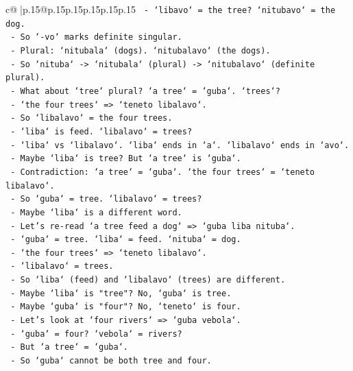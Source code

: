 \documentclass{article}
\begin{document}
{\begin{supertabular}{c@{$\;$}|p{.15\linewidth}@{}p{.15\linewidth}p{.15\linewidth}p{.15\linewidth}p{.15\linewidth}p{.15\linewidth}}
{{{\texttt{          {-} `libavo` = the tree? `nitubavo` = the dog.} \\
\texttt{          {-} So `{-}vo` marks definite singular.} \\
\texttt{          {-} Plural: `nitubala` (dogs). `nitubalavo` (the dogs).} \\
\texttt{          {-} So `nituba` {-}> `nitubala` (plural) {-}> `nitubalavo` (definite plural).} \\
\texttt{          {-} What about `tree` plural? `a tree` = `guba`. `trees`?} \\
\texttt{          {-} `the four trees` => `teneto libalavo`.} \\
\texttt{          {-} So `libalavo` = the four trees.} \\
\texttt{          {-} `liba` is feed. `libalavo` = trees?} \\
\texttt{          {-} `liba` vs `libalavo`. `liba` ends in `a`. `libalavo` ends in `avo`.} \\
\texttt{          {-} Maybe `liba` is tree? But `a tree` is `guba`.} \\
\texttt{          {-} Contradiction: `a tree` = `guba`. `the four trees` = `teneto libalavo`.} \\
\texttt{          {-} So `guba` = tree. `libalavo` = trees?} \\
\texttt{          {-} Maybe `liba` is a different word.} \\
\texttt{          {-} Let's re{-}read `a tree feed a dog` => `guba liba nituba`.} \\
\texttt{          {-} `guba` = tree. `liba` = feed. `nituba` = dog.} \\
\texttt{          {-} `the four trees` => `teneto libalavo`.} \\
\texttt{          {-} `libalavo` = trees.} \\
\texttt{          {-} So `liba` (feed) and `libalavo` (trees) are different.} \\
\texttt{          {-} Maybe `liba` is "tree"? No, `guba` is tree.} \\
\texttt{          {-} Maybe `guba` is "four"? No, `teneto` is four.} \\
\texttt{          {-} Let's look at `four rivers` => `guba vebola`.} \\
\texttt{          {-} `guba` = four? `vebola` = rivers?} \\
\texttt{          {-} But `a tree` = `guba`.} \\
\texttt{          {-} So `guba` cannot be both tree and four.} \\
}}}
\end{supertabular}}
\end{document}
